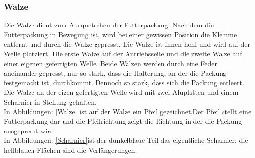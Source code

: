 \subsubsection{Walze}

Die Walze dient zum Ausquetschen der Futterpackung. Nach dem die Futterpackung in Bewegung ist, wird bei einer gewissen Position die Klemme entfernt und durch die Walze gepresst. Die Walze ist innen hohl und wird auf der Welle platziert. Die erste Walze auf der Antriebsseite und die zweite Walze auf einer eigenen gefertigten Welle. Beide Walzen werden durch eine Feder aneinander gepresst, nur so stark, dass die Halterung, an der die Packung festgemacht ist, durchkommt. Dennoch so stark, dass sich die Packung entleert. Die Walze an der eigen gefertigten Welle wird mit zwei Aluplatten und einem Scharnier in Stellung gehalten.\\ 
In Abbildungen: \ref{Walze} ist auf der Walze ein Pfeil gezeichnet.Der Pfeil stellt eine Futterpackung dar und die Pfeilrichtung zeigt die Richtung in der die Packung ausgepresst wird.  \\
In Abbildungen: \ref{Scharnier}ist der dunkelblaue Teil das eigentliche Scharnier, die hellblauen Flächen sind die Verlängerungen. 

